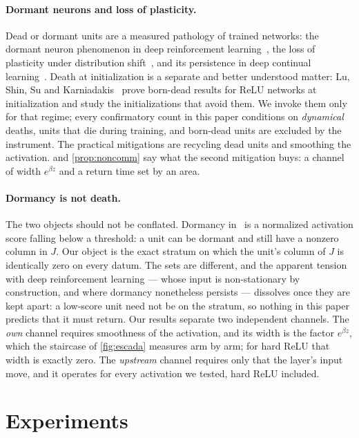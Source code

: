 \documentclass[11pt]{article}
\theoremstyle{definition}
\theoremstyle{remark}
\begin{document}
\paragraph{Dormant neurons and loss of plasticity.} Dead or dormant units are
a measured pathology of trained networks: the dormant neuron phenomenon in
deep reinforcement learning~\cite{Sokar23}, the loss of plasticity under
distribution shift~\cite{Lyle23}, and its persistence in deep continual
learning~\cite{Dohare24}. Death at initialization is a separate and better
understood matter: Lu, Shin, Su and Karniadakis~\cite{Lu20} prove born-dead
results for ReLU networks at initialization and study the initializations that
avoid them. We invoke them only for that regime; every confirmatory count in
this paper conditions on \emph{dynamical} deaths, units that die during
training, and born-dead units are excluded by the instrument. The practical
mitigations are recycling dead units and smoothing the activation.
 and \cref{prop:noncomm} say what the second mitigation buys: a
channel of width $e^{\beta z}$ and a return time set by an area.

\paragraph{Dormancy is not death.} The two objects should not be conflated.
Dormancy in~\cite{Sokar23} is a normalized activation score falling below a
threshold: a unit can be dormant and still have a nonzero column in $J$. Our
object is the exact stratum on which the unit's column of $J$ is identically zero
on every datum. The sets are different, and the apparent tension with deep
reinforcement learning --- whose input is non-stationary by construction, and
where dormancy nonetheless persists --- dissolves once they are kept apart: a
low-score unit need not be on the stratum, so nothing in this paper predicts
that it must return. Our results separate two independent channels. The
\emph{own} channel requires smoothness of the activation, and its width is the
factor $e^{\beta z}$, which the staircase of \cref{fig:escada} measures arm by
arm; for hard ReLU that width is exactly zero. The \emph{upstream} channel
requires only that the layer's input move, and it operates for every activation
we tested, hard ReLU included.

\section{Experiments}\label{sec:experiments}
\end{document}
